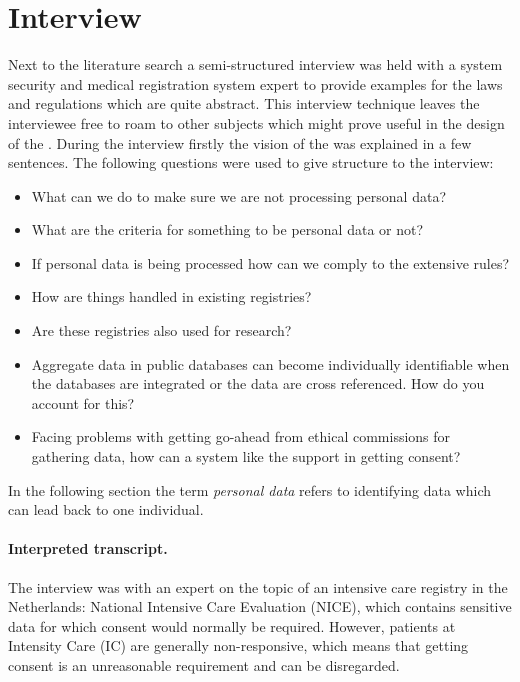 \section{Interview}
\label{security-interviews}

Next to the literature search a semi-structured interview was held with a system security and medical registration system expert to provide examples for the laws and regulations which are quite abstract.
This interview technique leaves the interviewee free to roam to other subjects which might prove useful in the design of the \ivfsystem{}.
During the interview firstly the vision of the \ivfsystem{} was explained in a few sentences.
The following questions were used to give structure to the interview:

\begin{itemize}
  \item What can we do to make sure we are not processing personal data?
  \item What are the criteria for something to be personal data or not?
  \item If personal data is being processed how can we comply to the extensive rules?
  \item How are things handled in existing registries?
  \item Are these registries also used for research?
  \item Aggregate data in public databases can become individually identifiable when the databases are integrated or the data are cross referenced. 
  How do you account for this?
  \item Facing problems with getting go-ahead from ethical commissions for gathering data, how can a system like the \ivfsystem{} support in getting consent?
\end{itemize}

In the following section the term \emph{personal data} refers to identifying data which can lead back to one individual.


\paragraph{Interpreted transcript.}
\label{security-interview-transcript}


The interview was with an expert on the topic of an intensive care registry in the Netherlands: National Intensive Care Evaluation (NICE), 
which contains sensitive data for which consent would normally be required. 
However, patients at Intensity Care (IC) are generally non-responsive, which means that getting consent is an unreasonable requirement and can be disregarded.

